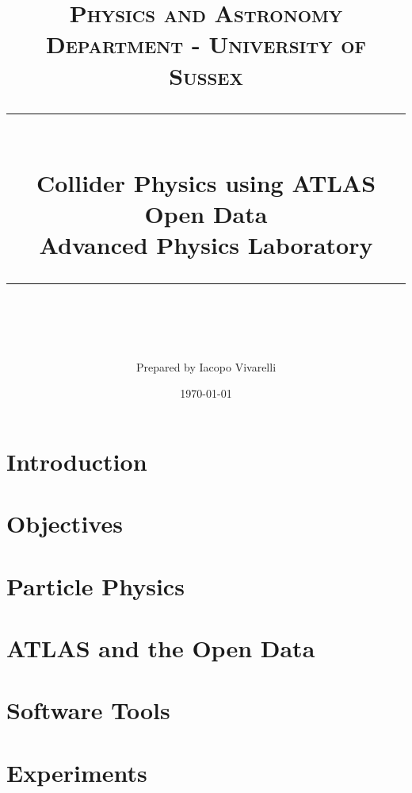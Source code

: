 \documentclass[11pt]{scrartcl} %
\title{	
	\normalfont\normalsize
	\textsc{Physics and Astronomy Department - University of Sussex}\\ %
	\vspace{25pt} %
	\rule{\linewidth}{0.5pt}\\ %
	\vspace{20pt} %
	{\huge Collider Physics using ATLAS Open Data}\\ %
	\vspace{0.5cm}
	{\large Advanced Physics Laboratory}
	\vspace{12pt} %
	\rule{\linewidth}{2pt}\\ %
	\vspace{12pt} %
}
\author{\large Prepared by Iacopo Vivarelli} %
\date{\normalsize\today} %
\begin{document}
\maketitle %


\newpage

\section{Introduction} 


\section{Objectives} 


\section{Particle Physics} 


\section{ATLAS and the Open Data}


\section{Software Tools}


\section{Experiments}

\end{document}
